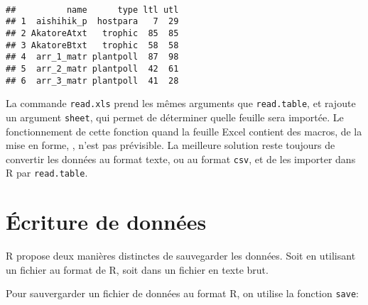 \begin{knitrout}
\color{fgcolor}\begin{kframe}
\begin{flushleft}
\ttfamily\noindent
{}\hlassignement{\usebox{\hlnormalsizeboxlessthan}-}{\ }\hlkeyword{(}\hlkeyword{,}{\ }\hlargument{=}{\ }\hlkeyword{,}{\ }\hlargument{=}{\ }\hlkeyword{)}\hspace*{\fill}\\
\hlstd{}\hlkeyword{(}\hlkeyword{)}\mbox{}
\normalfont
\end{flushleft}
\begin{verbatim}
##          name      type ltl utl
## 1  aishihik_p  hostpara   7  29
## 2 AkatoreAtxt   trophic  85  85
## 3 AkatoreBtxt   trophic  58  58
## 4  arr_1_matr plantpoll  87  98
## 5  arr_2_matr plantpoll  42  61
## 6  arr_3_matr plantpoll  41  28
\end{verbatim}
\end{kframe}
\end{knitrout}


\noindent La commande \texttt{read.xls} prend les mêmes arguments que \texttt{read.table}, et rajoute un argument \texttt{sheet}, qui permet de déterminer quelle feuille sera importée.
Le fonctionnement de cette fonction quand la feuille Excel contient des macros, de la mise en forme, , n'est pas prévisible.
La meilleure solution reste toujours de convertir les données au format texte, ou au format \texttt{csv}, et de les importer dans R par \texttt{read.table}. 

\section{Écriture de données}

R propose deux manières distinctes de sauvegarder les données.
Soit en utilisant un fichier au format de R, soit dans un fichier en texte brut.

Pour sauvergarder un fichier de données au format R, on utilise la fonction \texttt{save}:

\begin{knitrout}
\color{fgcolor}\begin{kframe}
\begin{flushleft}
\ttfamily\noindent
{}\hlkeyword{(}\hlkeyword{,}{\ }\hlargument{=}{\ }\hlkeyword{)}\mbox{}
\normalfont
\end{flushleft}
\end{kframe}
\end{knitrout}


